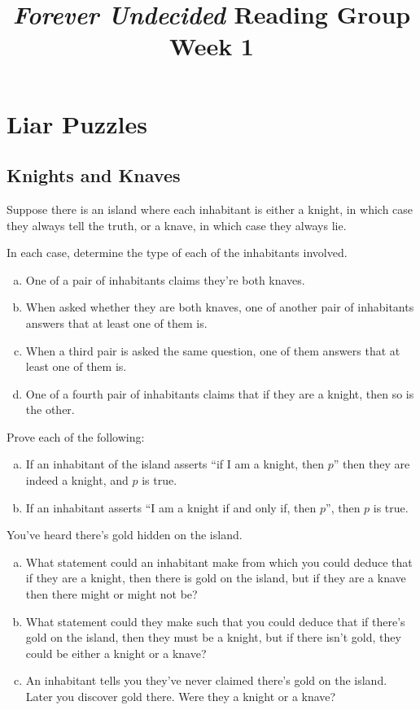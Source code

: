 \documentclass{article}
\title{\emph{Forever Undecided} Reading Group \\ Week 1}
\date{}
\author{}
\begin{document}
\maketitle

\section*{Liar Puzzles}

\subsection*{Knights and Knaves}
Suppose there is an island where each inhabitant is either a knight, in which case they always tell the truth, or a knave, in which case they always lie.

\begin{prob}{1.1}
    In each case, determine the type of each of the inhabitants involved.
    \begin{enumerate}[a)]
        \item One of a pair of inhabitants claims they're both knaves.
        \item When asked whether they are both knaves, one of another pair of inhabitants answers that at least one of them is.
        \item When a third pair is asked the same question, one of them answers that at least one of them is.
        \item One of a fourth pair of inhabitants claims that if they are a knight, then so is the other.
    \end{enumerate}
\end{prob}

\begin{prob}{1.2}
    Prove each of the following:
    \begin{enumerate}[a)]
        \item If an inhabitant of the island asserts ``if I am a knight, then $p$'' then they are indeed a knight, and $p$ is true.
        \item If an inhabitant asserts ``I am a knight if and only if, then $p$'', then $p$ is true.
    \end{enumerate}
\end{prob}

\begin{prob}{1.3}
    You've heard there's gold hidden on the island.
    \begin{enumerate}[a)]
        \item What statement could an inhabitant make from which you could deduce that if they are a knight, then there is gold on the island, but if they are a knave then there might or might not be?
        \item What statement could they make such that you could deduce that if there's gold on the island, then they must be a knight, but if there isn't gold, they could be either a knight or a knave?
        \item An inhabitant tells you they've never claimed there's gold on the island. Later you discover gold there. Were they a knight or a knave?
    \end{enumerate}
\end{prob}
\end{document}
